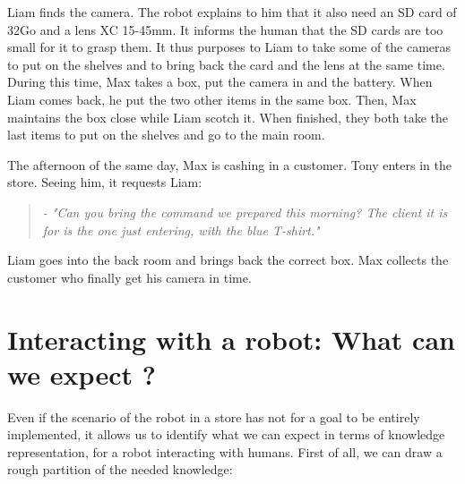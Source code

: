 Liam finds the camera. The robot explains to him that it also need an SD card of 32Go and a lens XC 15-45mm. It informs the human that the SD cards are too small for it to grasp them. It thus purposes to Liam to take some of the cameras to put on the shelves and to bring back the card and the lens at the same time. During this time, Max takes a box, put the camera in and the battery. When Liam comes back, he put the two other items in the same box. Then, Max maintains the box close while Liam scotch it. When finished, they both take the last items to put on the shelves and go to the main room.

The afternoon of the same day, Max is cashing in a customer. Tony enters in the store. Seeing him, it requests Liam:

\begin{quote} 
\centering 
\textit{
- "Can you bring the command we prepared this morning? The client it is for is the one just entering, with the blue T-shirt."}
\end{quote}

Liam goes into the back room and brings back the correct box. Max collects the customer who finally get his camera in time.

\section{Interacting with a robot: What can we expect ?}

Even if the scenario of the robot in a store has not for a goal to be entirely implemented, it allows us to identify what we can expect in terms of knowledge representation, for a robot interacting with humans. First of all, we can draw a rough partition of the needed knowledge:

